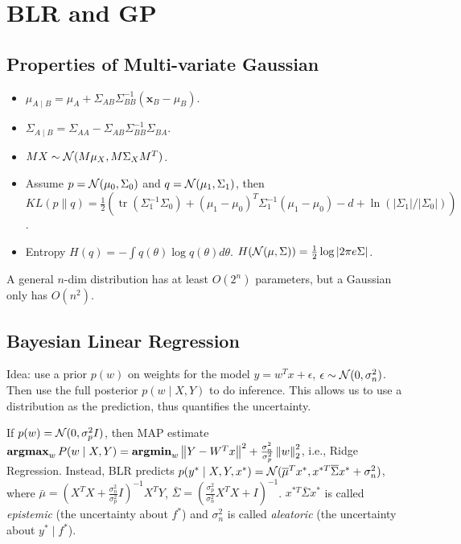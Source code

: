 \section{BLR and GP}

\subsection{Properties of Multi-variate Gaussian}

\begin{itemize}
    \item $\mu_{A \mid B}=\mu_{A}+\Sigma_{A B} \Sigma_{B B}^{-1}\left(\mathbf{x}_{B}-\mu_{B}\right)$.
    \item $\Sigma_{A \mid B}=\Sigma_{A A}-\Sigma_{A B} \Sigma_{B B}^{-1} \Sigma_{B A}$.
    \item $MX \sim \mathcal{N}(M\mu_X, M\Sigma_X M^T)$.
    \item Assume $p=\mathcal{N}(\mu_0,\Sigma_0)$ and $q=\mathcal{N}(\mu_1,\Sigma_1)$, then $K L(p \| q)=\frac{1}{2}(\operatorname{tr}\left(\Sigma_{1}^{-1} \Sigma_{0}\right)+\left(\mu_{1}-\mu_{0}\right)^{T} \Sigma_{1}^{-1}\left(\mu_{1}-\mu_{0}\right)-d+\ln \left(\left|\Sigma_{1}\right| / \left|\Sigma_{0}\right| \right))$.
    \item Entropy $H(q)=-\int q(\theta)\log q(\theta) d\theta$. $H(\mathcal{N}(\mu,\Sigma)) = \frac{1}{2} \log |2\pi e\Sigma|$.
\end{itemize}

A general $n$-dim distribution has at least $O(2^n)$ parameters, but a Gaussian only
has $O(n^2)$.

\subsection{Bayesian Linear Regression}

Idea: use a prior $p(w)$ on weights for the model $y=w^T x+\epsilon$, $\epsilon\sim \mathcal{N}(0,\sigma_n^2)$. Then use the full posterior $p(w\mid X,Y)$ to do inference. This allows us to use a distribution as the prediction, thus quantifies the uncertainty.

If $p(w)=\mathcal{N}(0,\sigma_p^2 I)$, then MAP estimate $\operatorname{\textbf{argmax}}_w P(w\mid X,Y) = \operatorname{\textbf{argmin}}_w \left\lVert Y-W^T x\right\rVert^2 +\frac{\sigma_n^2}{\sigma_p^2}\left\lVert w\right\rVert_2^2$, i.e., Ridge Regression. Instead, BLR predicts $p(y^*\mid X,Y,x^*)=\mathcal{N}(\overline{\mu}^T x^*, x^{*T}\overline{\Sigma}x^*+\sigma_n^2)$, where $\bar{\mu} = (X^TX+\frac{\sigma_n^2}{\sigma_p^2}I)^{-1}X^T Y$, $\bar{\Sigma}=\left(\frac{\sigma_p^2}{\sigma_n^2}X^T X+I\right)^{-1}$. $x^{*T}\bar{\Sigma}x^*$ is called \emph{epistemic} (the uncertainty about $f^*$) and $\sigma_n^2$ is called \emph{aleatoric} (the uncertainty about $y^*\mid f^*$).

